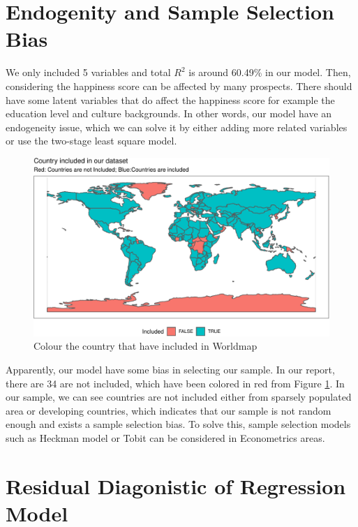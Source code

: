 \documentclass[11pt,a4paper,]{article}
\begin{document}
\hypertarget{endogenity-and-sample-selection-bias}{%
\section{Endogenity and Sample Selection Bias}\label{endogenity-and-sample-selection-bias}}

We only included 5 variables and total \(R^2\) is around 60.49\% in our model. Then, considering the happiness score can be affected by many prospects. There should have some latent variables that do affect the happiness score for example the education level and culture backgrounds. In other words, our model have an endogeneity issue, which we can solve it by either adding more related variables or use the two-stage least square model.

\begin{figure}
\centering
\includegraphics{Assignment4_files/figure-latex/worldmapall-1.pdf}
\caption{\label{fig:worldmapall}Colour the country that have included in Worldmap}
\end{figure}

Apparently, our model have some bias in selecting our sample. In our report, there are 34 are not included, which have been colored in red from Figure \ref{fig:worldmapall}. In our sample, we can see countries are not included either from sparsely populated area or developing countries, which indicates that our sample is not random enough and exists a sample selection bias. To solve this, sample selection models such as Heckman model or Tobit can be considered in Econometrics areas.

\newpage

\hypertarget{residual-diagonistic-of-regression-model}{%
\section{Residual Diagonistic of Regression Model}\label{residual-diagonistic-of-regression-model}}
\end{document}
